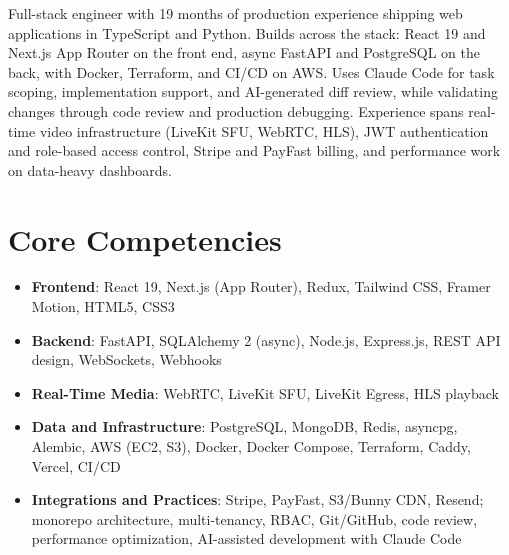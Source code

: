 \documentclass[11pt,a4paper,sans]{moderncv}
\begin{document}
\makecvtitle


\vspace{6pt}
\small{Full-stack engineer with 19 months of production experience shipping web applications in TypeScript and Python. Builds across the stack: React 19 and Next.js App Router on the front end, async FastAPI and PostgreSQL on the back, with Docker, Terraform, and CI/CD on AWS. Uses Claude Code for task scoping, implementation support, and AI-generated diff review, while validating changes through code review and production debugging. Experience spans real-time video infrastructure (LiveKit SFU, WebRTC, HLS), JWT authentication and role-based access control, Stripe and PayFast billing, and performance work on data-heavy dashboards.}


\section{Core Competencies}
\vspace{1pt}
\begin{itemize}

\item \textbf{Frontend}: React 19, Next.js (App Router), Redux, Tailwind CSS, Framer Motion, HTML5, CSS3

\item \textbf{Backend}: FastAPI, SQLAlchemy 2 (async), Node.js, Express.js, REST API design, WebSockets, Webhooks

\item \textbf{Real-Time Media}: WebRTC, LiveKit SFU, LiveKit Egress, HLS playback

\item \textbf{Data and Infrastructure}: PostgreSQL, MongoDB, Redis, asyncpg, Alembic, AWS (EC2, S3), Docker, Docker Compose, Terraform, Caddy, Vercel, CI/CD

\item \textbf{Integrations and Practices}: Stripe, PayFast, S3/Bunny CDN, Resend; monorepo architecture, multi-tenancy, RBAC, Git/GitHub, code review, performance optimization, AI-assisted development with Claude Code

\end{itemize}
\end{document}
